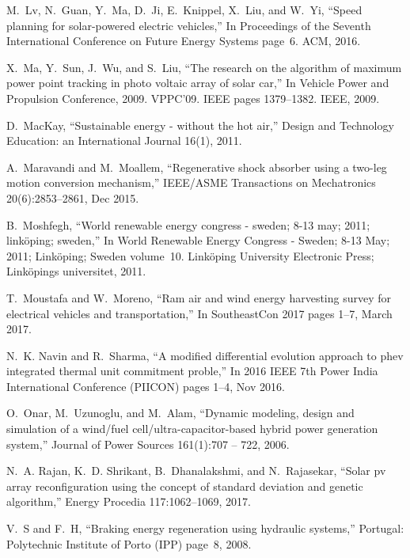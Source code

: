 M.~Lv, N.~Guan, Y.~Ma, D.~Ji, E.~Knippel, X.~Liu, and W.~Yi,
\newblock ``Speed planning for solar-powered electric vehicles,''
\newblock In Proceedings of the Seventh International Conference on Future
  Energy Systems page~6. ACM, 2016.

X.~Ma, Y.~Sun, J.~Wu, and S.~Liu,
\newblock ``The research on the algorithm of maximum power point tracking in
  photo voltaic array of solar car,''
\newblock In Vehicle Power and Propulsion Conference, 2009. VPPC'09.
  IEEE pages 1379--1382. IEEE, 2009.

D.~MacKay,
\newblock ``Sustainable energy - without the hot air,''
\newblock Design and Technology Education: an International Journal
  16(1), 2011.

A.~Maravandi and M.~Moallem,
\newblock ``Regenerative shock absorber using a two-leg motion conversion
  mechanism,''
\newblock IEEE/ASME Transactions on Mechatronics 20(6):2853--2861, Dec
  2015.

B.~Moshfegh,
\newblock ``World renewable energy congress - sweden; 8-13 may; 2011; link\"{o}ping;
  sweden,''
\newblock In World Renewable Energy Congress - Sweden; 8-13 May; 2011;
  Link\"{o}ping; Sweden volume~10. Link\"{o}ping University Electronic Press;
  Link\"{o}pings universitet, 2011.

T.~Moustafa and W.~Moreno,
\newblock ``Ram air and wind energy harvesting survey for electrical vehicles and
  transportation,''
\newblock In SoutheastCon 2017 pages 1--7, March 2017.

N.~K. Navin and R.~Sharma,
\newblock ``A modified differential evolution approach to phev integrated thermal
  unit commitment proble,''
\newblock In 2016 IEEE 7th Power India International Conference (PIICON)
  pages 1--4, Nov 2016.

O.~Onar, M.~Uzunoglu, and M.~Alam,
\newblock ``Dynamic modeling, design and simulation of a wind/fuel
  cell/ultra-capacitor-based hybrid power generation system,''
\newblock Journal of Power Sources 161(1):707 -- 722, 2006.

N.~A. Rajan, K.~D. Shrikant, B.~Dhanalakshmi, and N.~Rajasekar,
\newblock ``Solar pv array reconfiguration using the concept of standard
  deviation and genetic algorithm,''
\newblock Energy Procedia 117:1062--1069, 2017.

V.~S and F.~H,
\newblock ``Braking energy regeneration using hydraulic systems,''
\newblock Portugal: Polytechnic Institute of Porto (IPP) page~8, 2008.

